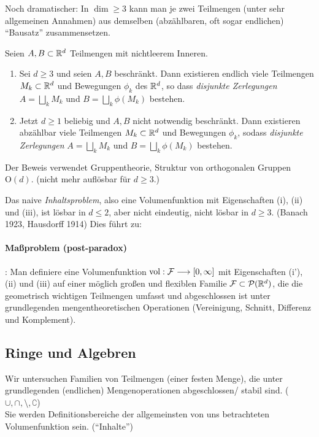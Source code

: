 Noch dramatischer: In $\dim \geq 3$ kann man je zwei Teilmengen (unter sehr allgemeinen Annahmen) aus demselben (abzählbaren, oft sogar endlichen) ``Bausatz'' zusammensetzen.
\begin{satz} Seien $A,B\subset \mathbb{R}^d$ Teilmengen mit nichtleerem Inneren.
\begin{enumerate}[(\roman*)]
\item Sei $d \geq 3$ und seien $A,B$ beschränkt. Dann existieren endlich viele Teilmengen $M_k \subset \mathbb{R}^d$ und Bewegungen $\phi_k$ des $\mathbb{R}^d$, so dass \emph{disjunkte Zerlegungen} $A=\bigsqcup_k M_k$ und $B = \bigsqcup_k \phi(M_k)$ bestehen.
\item Jetzt $d\geq 1$ beliebig und $A,B$ nicht notwendig beschränkt. Dann existieren abzählbar viele Teilmengen $M_k \subset \mathbb{R}^d$ und Bewegungen $\phi_k$, sodass  \emph{disjunkte Zerlegungen} $A=\bigsqcup_k M_k$ und $B = \bigsqcup_k \phi(M_k)$ bestehen.
\end{enumerate}
Der Beweis verwendet Gruppentheorie, Struktur von orthogonalen Gruppen $\mathrm{O}(d)$. (nicht mehr auflösbar für $d\geq 3$.)
\end{satz}
Das naive \emph{Inhaltsproblem}, also eine Volumenfunktion mit Eigenschaften (i), (ii) und (iii), ist lösbar in $d\leq 2$, aber nicht eindeutig, nicht lösbar in $d\geq 3$. (Banach 1923, Hausdorff 1914) Dies führt zu:
\vspace{-10pt}
\paragraph{Maßproblem (post-paradox)}: Man definiere eine Volumenfunktion $\operatorname{vol}: \mathcal{F} \longrightarrow [0,\infty]$ mit Eigenschaften (i'), (ii) und (iii) auf einer möglich großen und flexiblen Familie $\mathcal{F} \subset \mathcal{P}(\mathbb{R}^d)$, die die geometrisch wichtigen Teilmengen umfasst und abgeschlossen ist unter grundlegenden mengentheoretischen Operationen (Vereinigung, Schnitt, Differenz und Komplement). 
\subsection{Ringe und Algebren}
Wir untersuchen Familien von Teilmengen (einer festen Menge), die unter grundlegenden (endlichen) Mengenoperationen abgeschlossen/ stabil sind. ($\cup,\cap,\setminus,\complement$) \\
Sie werden Definitionsbereiche der allgemeinsten von uns betrachteten Volumenfunktion sein. (``Inhalte'')

